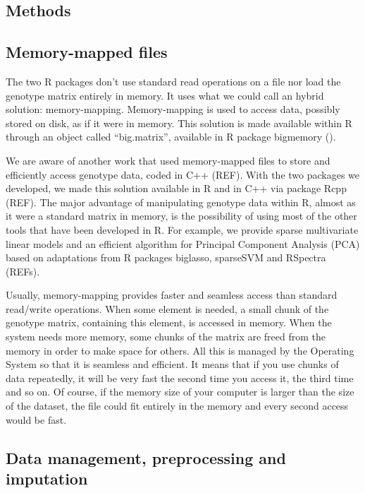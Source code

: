 \documentclass{bioinfo}
\begin{document}
\begin{methods}
\section{Methods}

\subsection{Memory-mapped files}

The two R packages don't use standard read operations on a file nor load the genotype matrix entirely in memory. It uses what we could call an hybrid solution: memory-mapping. Memory-mapping is used to access data, possibly stored on disk, as if it were in memory. This solution is made available within R through an object called ``big.matrix'', available in R package bigmemory (\cite{Kane2013}).


We are aware of another work that used memory-mapped files to store and efficiently access genotype data, coded in C++ (REF). With the two packages we developed, we made this solution available in R and in C++ via package Rcpp (REF). The major advantage of manipulating genotype data within R, almost as it were a standard matrix in memory, is the possibility of using most of the other tools that have been developed in R. For example, we provide sparse multivariate linear models and an efficient algorithm for Principal Component Analysis (PCA) based on adaptations from R packages biglasso, sparseSVM and RSpectra (REFs).

Usually, memory-mapping provides faster and seamless access than standard read/write operations. When some element is needed, a small chunk of the genotype matrix, containing this element, is accessed in memory. When the system needs more memory, some chunks of the matrix are freed from the memory in order to make space for others. All this is managed by the Operating System so that it is seamless and efficient. It means that if you use chunks of data repeatedly, it will be very fast the second time you access it, the third time and so on. Of course, if the memory size of your computer is larger than the size of the dataset, the file could fit entirely in the memory and every second access would be fast. 


\subsection{Data management, preprocessing and imputation} \label{sec:preprocess}


\end{methods}
\end{document}
